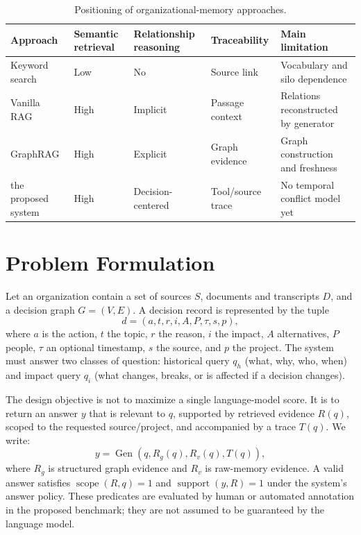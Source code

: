 \documentclass[conference]{IEEEtran}
\newcommand{\system}{the proposed system}
\begin{document}
\begin{table}[t]
\caption{Positioning of organizational-memory approaches.}
\label{tab:comparison}
\centering\small
\begin{tabular}{p{1.35cm}p{1.2cm}p{1.3cm}p{1.35cm}p{1.3cm}}
\toprule
Approach & Semantic retrieval & Relationship reasoning & Traceability & Main limitation\\
\midrule
Keyword search & Low & No & Source link & Vocabulary and silo dependence\\
Vanilla RAG & High & Implicit & Passage context & Relations reconstructed by generator\\
GraphRAG & High & Explicit & Graph evidence & Graph construction and freshness\\
\system & High & Decision-centered & Tool/source trace & No temporal conflict model yet\\
\bottomrule
\end{tabular}
\end{table}

\section{Problem Formulation}
Let an organization contain a set of sources $S$, documents and transcripts $D$, and a decision graph $G=(V,E)$. A decision record is represented by the tuple
\begin{equation}
 d=(a,t,r,i,A,P,\tau,s,p),
\end{equation}
where $a$ is the action, $t$ the topic, $r$ the reason, $i$ the impact, $A$ alternatives, $P$ people, $\tau$ an optional timestamp, $s$ the source, and $p$ the project. The system must answer two classes of question: historical query $q_h$ (what, why, who, when) and impact query $q_i$ (what changes, breaks, or is affected if a decision changes).

The design objective is not to maximize a single language-model score. It is to return an answer $y$ that is relevant to $q$, supported by retrieved evidence $R(q)$, scoped to the requested source/project, and accompanied by a trace $T(q)$. We write:
\begin{equation}
 y = \operatorname{Gen}(q, R_g(q), R_v(q), T(q)),
\end{equation}
where $R_g$ is structured graph evidence and $R_v$ is raw-memory evidence. A valid answer satisfies $\operatorname{scope}(R,q)=1$ and $\operatorname{support}(y,R)=1$ under the system's answer policy. These predicates are evaluated by human or automated annotation in the proposed benchmark; they are not assumed to be guaranteed by the language model.
\end{document}
